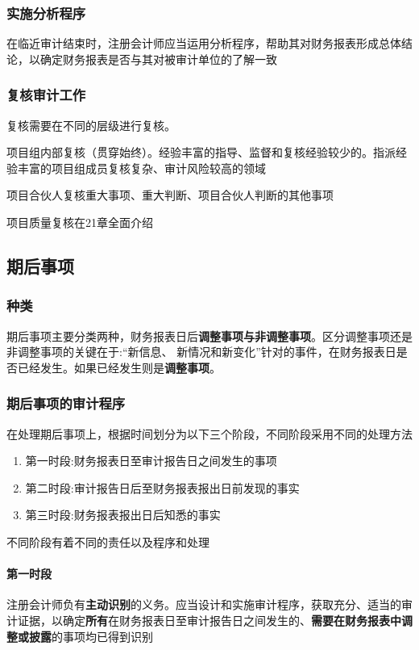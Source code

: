 \documentclass[UTF8,12pt]{ctexart}
\numberwithin{equation}{section} %
\numberwithin{figure}{section}
\numberwithin{table}{section}
\begin{document}
	\subsubsection{实施分析程序}
	在临近审计结束时，注册会计师应当运用分析程序，帮助其对财务报表形成总体结论，以确定财务报表是否与其对被审计单位的了解一致
	
	\subsubsection{复核审计工作}
	复核需要在不同的层级进行复核。
	
	项目组内部复核（贯穿始终）。经验丰富的指导、监督和复核经验较少的。指派经验丰富的项目组成员复核复杂、审计风险较高的领域
	
	项目合伙人复核重大事项、重大判断、项目合伙人判断的其他事项
	
	项目质量复核在21章全面介绍
	
	\subsection{期后事项}
	
	\subsubsection{种类}
	期后事项主要分类两种，财务报表日后\textbf{调整事项与非调整事项}。区分调整事项还是非调整事项的关键在于:“新信息、 新情况和新变化”针对的事件，在财务报表日是否已经发生。如果已经发生则是\textbf{调整事项}。
	
	\subsubsection{期后事项的审计程序}
	在处理期后事项上，根据时间划分为以下三个阶段，不同阶段采用不同的处理方法
	\begin{enumerate}
		\item 第一时段:财务报表日至审计报告日之间发生的事项
		
		\item 第二时段:审计报告日后至财务报表报出日前发现的事实
		
		\item 第三时段:财务报表报出日后知悉的事实
	\end{enumerate}
	不同阶段有着不同的责任以及程序和处理
	
	\paragraph{第一时段}
	注册会计师负有\textbf{主动识别}的义务。应当设计和实施审计程序，获取充分、适当的审计证据，以确定\textbf{所有}在财务报表日至审计报告日之间发生的、\textbf{需要在财务报表中调整或披露}的事项均已得到识别
	
\end{document}

